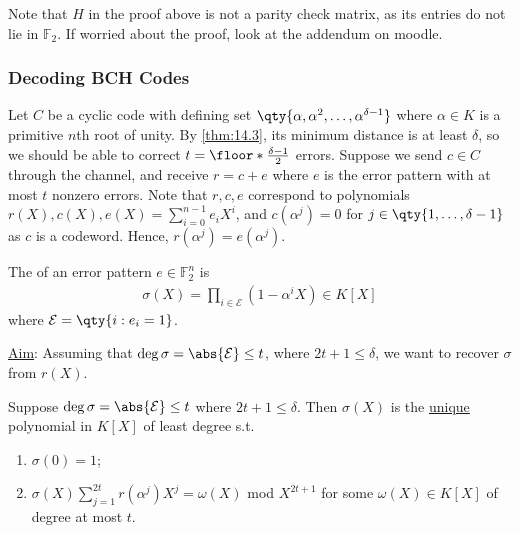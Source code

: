 Note that $H$ in the proof above is not a parity check matrix, as its entries do not lie in $\mathbb F_2$.
If worried about the proof, look at the addendum on moodle.

\subsubsection{Decoding BCH Codes}

Let $C$ be a cyclic code with defining set $\qty{\alpha, \alpha^2, \dots, \alpha^{\delta - 1}}$ where $\alpha \in K$ is a primitive $n$th root of unity.
By \cref{thm:14.3}, its minimum distance is at least $\delta$, so we should be able to correct $t = \floor*{\frac{\delta - 1}{2}}$ errors.
Suppose we send $c \in C$ through the channel, and receive $r = c + e$ where $e$ is the error pattern with at most $t$ nonzero errors.
Note that $r, c, e$ correspond to polynomials $r(X), c(X), e(X) = \sum_{i=0}^{n-1} e_i X^i$, and $c(\alpha^j) = 0$ for $j \in \qty{1, \dots, \delta - 1}$ as $c$ is a codeword.
Hence, $r(\alpha^j) = e(\alpha^j)$.

\begin{definition}
    The  of an error pattern $e \in \mathbb F_2^n$ is
    \begin{align*}
        \sigma(X) = \prod_{i \in \mathcal E} (1 - \alpha^i X) \in K[X]
    \end{align*}
    where $\mathcal E = \qty{i : e_i = 1}$.
\end{definition}

\underline{Aim}: Assuming that $\deg \sigma = \abs{\mathcal E} \leq t$, where $2t + 1 \leq \delta$, we want to recover $\sigma$ from $r(X)$.

\begin{theorem}
    Suppose $\deg \sigma = \abs{\mathcal E} \leq t$ where $2t + 1 \leq \delta$.
    Then $\sigma(X)$ is the \underline{unique} polynomial in $K[X]$ of least degree s.t.
    \begin{enumerate}
        \item $\sigma(0) = 1$;
        \item $\sigma(X) \sum_{j=1}^{2t} r(\alpha^j) X^j = \omega(X)$ mod $X^{2t+1}$ for some $\omega(X) \in K[X]$ of degree at most $t$.
    \end{enumerate}
\end{theorem}

